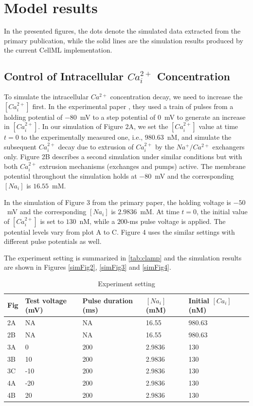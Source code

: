 \documentclass[fleqn,10pt]{physiome}
\begin{document}
\section{Model results}
\label{sed:modelResults}
In the presented figures, the dots denote the simulated data extracted from the primary publication, while the solid lines are the simulation results produced by the current CellML implementation.

\subsection{Control of Intracellular $Ca_{i}^{2+}$  Concentration}
To simulate the intracellular $Ca^{2+}$ concentration decay, we need to increase the $[Ca_{i}^{2+}]$ first. In the experimental paper \citep{shmigol1998carboxyeosin}, they used a train of pulses from a holding potential of $-80$~mV to a step potential of $0$~mV to generate an increase in $[Ca_{i}^{2+}]$. In our simulation of Figure 2A, we set the $[Ca_{i}^{2+}]$ value at time $t=0$ to the experimentally measured one, i.e., $980.63$~nM, and simulate the subsequent $Ca_{i}^{2+}$ decay due to extrusion of $Ca_{i}^{2+}$ by the $Na^{+}/Ca^{2+}$ exchangers only. Figure 2B describes a second simulation under similar conditions but with both $Ca_{i}^{2+}$ extrusion mechanisms (exchanges and pumps) active. The membrane potential throughout the simulation holds at $-80$~mV and the corresponding $[Na_{i}]$ is $16.55$~mM.

In the simulation of Figure 3 from the primary paper, the holding voltage is $-50$~mV and the corresponding $[Na_{i}]$ is $2.9836$~mM. At time $t=0$, the initial value of $[Ca_{i}^{2+}]$ is set to $130$~nM, while a $200$-ms pulse voltage is applied. The potential levels vary from plot A to C. Figure 4 uses the similar settings with different pulse potentials as well. 

The experiment setting is summarized in \autoref{tab:clamp} and the simulation results are shown in Figures \ref{simFig2}, \ref{simFig3} and \ref{simFig4}.

\begin{table}[hbt!]\centering
\caption{Experiment setting}\label{tab:clamp}
\begin{tabularx}{\textwidth}{m{1cm}m{3cm}m{3cm}m{2.3cm}XX}
\toprule
Fig & Test voltage (mV) &  Pulse duration (ms) & $[Na_i]$ (mM) & Initial $[Ca_i]$ (nM)\\
\midrule
2A &  NA  & NA & 16.55 & 980.63 \\
2B &  NA & NA & 16.55 & 980.63\\
3A & 0 & 200 & 2.9836 & 130\\
3B & 10 & 200  & 2.9836 & 130\\
3C &  -10 & 200  & 2.9836 & 130\\
4A & -20 & 200  & 2.9836 & 130\\
4B &  20 & 200  & 2.9836 & 130 \\
\bottomrule
\end{tabularx}
\end{table}
\end{document}
